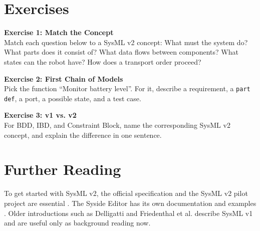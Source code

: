 \section{Exercises}
\begin{uebungbox}
\textbf{Exercise 1: Match the Concept}\\
Match each question below to a SysML v2 concept: What must the system do? What parts does it consist of? What data flows between components? What states can the robot have? How does a transport order proceed?
\end{uebungbox}

\begin{uebungbox}
\textbf{Exercise 2: First Chain of Models}\\
Pick the function \enquote{Monitor battery level}. For it, describe a requirement, a \texttt{part def}, a port, a possible state, and a test case.
\end{uebungbox}

\begin{uebungbox}
\textbf{Exercise 3: v1 vs. v2}\\
For BDD, IBD, and Constraint Block, name the corresponding SysML v2 concept, and explain the difference in one sentence.
\end{uebungbox}

\section{Further Reading}
To get started with SysML v2, the official specification and the SysML v2 pilot project are essential \cite{sysmlv2pilot}. The Syside Editor has its own documentation and examples \cite{syside}. Older introductions such as Delligatti \cite{delligatti2014} and Friedenthal et al. \cite{friedenthal2014} describe SysML v1 and are useful only as background reading now.

